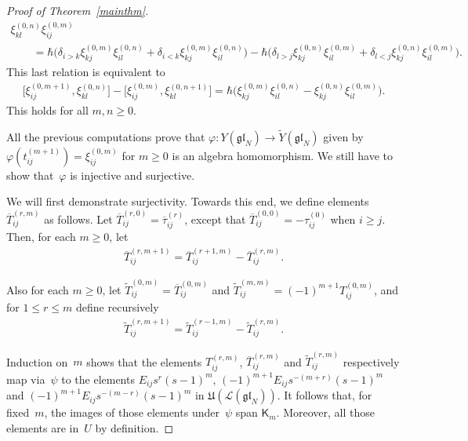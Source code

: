 \begin{proof}[Proof of Theorem~\ref{mainthm}]
\begin{gather*}
\xi_{kl}^{(0,n)} \xi_{ij}^{(0,m)}
\\
\qquad
= \hbar \big(\delta_{i>k} \xi_{kj}^{(0,m)} \xi_{il}^{(0,n)}+ \delta_{i<k} \xi_{kj}^{(0,m)} \xi_{il}^{(0,n)}\big)
  - \hbar \big(\delta_{l>j} \xi_{kj}^{(0,n)} \xi_{il}^{(0,m)} + \delta_{l<j} \xi_{kj}^{(0,n)} \xi_{il}^{(0,m)}\big).
\end{gather*}
This last relation is equivalent to
\begin{gather*}
\big[\xi_{ij}^{(0,m+1)}, \xi_{kl}^{(0,n)}\big] - \big[\xi_{ij}^{(0,m)}, \xi_{kl}^{(0,n+1)}\big] = \hbar \big(\xi_{kj}^{(0,m)}
\xi_{il}^{(0,n)} - \xi_{kj}^{(0,n)} \xi_{il}^{(0,m)}\big).
\end{gather*}
This holds for all $m,n\ge 0$.

All the previous computations prove that $\varphi\colon Y(\mathfrak{gl}_N) \longrightarrow
\widetilde{Y}(\mathfrak{gl}_N)$ given by $\varphi(t_{ij}^{(m+1)}) = \xi_{ij}^{(0,m)}$ for $m\ge 0$ is an
algebra homomorphism.
We still have to show that~$\varphi$ is injective and surjective.

We will f\/irst demonstrate surjectivity.
Towards this end, we def\/ine elements $\overline{T}_{ij}^{(r,m)}$ as follows.
Let $\overline{T}_{ij}^{(r,0)}=\overline{\tau}_{ij}^{(r)}$, except that $\overline{T}_{ij}^{(0,0)}=-\tau_{ij}^{(0)}$
when $i \geq j$.
Then, for each $m \geq 0$, let
\begin{gather*}
\overline{T}_{ij}^{(r,m+1)}=\overline{T}_{ij}^{(r+1,m)}-\overline{T}_{ij}^{(r,m)}.
\end{gather*}

Also for each $m \geq 0$, let $\widetilde{T}_{ij}^{(0,m)}=\overline{T}_{ij}^{(0,m)}$ and
$\widetilde{T}_{ij}^{(m,m)}=(-1)^{m+1}T_{ij}^{(0,m)}$, and for $1 \leq r \leq m$ def\/ine recursively
\begin{gather*}
\widetilde{T}_{ij}^{(r,m+1)}=\widetilde{T}_{ij}^{(r-1,m)}-\widetilde{T}_{ij}^{(r,m)}.
\end{gather*}


Induction on~$m$ shows that the elements $T_{ij}^{(r,m)}$, $\overline{T}_{ij}^{(r,m)}$ and $\widetilde{T}_{ij}^{(r,m)}$
respectively map via~$\psi$ to the elements $E_{ij}s^r(s-1)^m$, $(-1)^{m+1}E_{ij}s^{-(m+r)}(s-1)^m$ and
$(-1)^{m+1}E_{ij}s^{-(m-r)}(s-1)^m$ in $\mathfrak{U}(\mathcal{L}(\mathfrak{gl}_N))$.
It follows that, for f\/ixed~$m$, the images of those elements under~$\psi$ span $\mathsf{K}_m$.
Moreover, all those elements are in~$U$ by def\/inition.


\end{proof}
